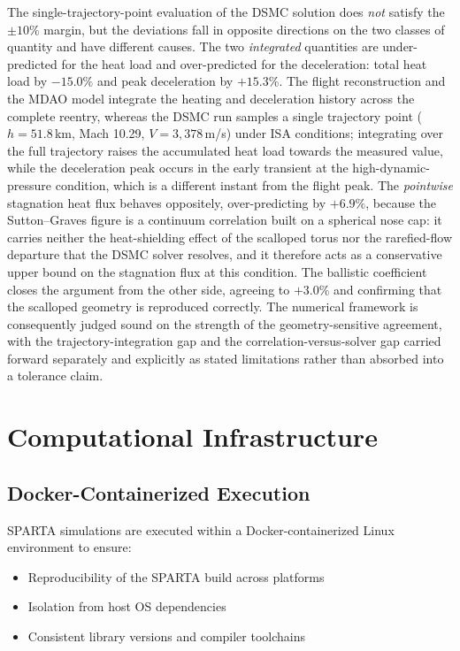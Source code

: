 The single-trajectory-point evaluation of the DSMC solution does \emph{not} satisfy the $\pm 10\%$ margin, but the deviations fall in opposite directions on the two classes of quantity and have different causes. The two \emph{integrated} quantities are under-predicted for the heat load and over-predicted for the deceleration: total heat load by $-15.0\%$ and peak deceleration by $+15.3\%$. The flight reconstruction and the MDAO model integrate the heating and deceleration history across the complete reentry, whereas the DSMC run samples a single trajectory point ($h = 51.8$\,km, Mach 10.29, $V = 3{,}378$\,m/s) under ISA conditions; integrating over the full trajectory raises the accumulated heat load towards the measured value, while the deceleration peak occurs in the early transient at the high-dynamic-pressure condition, which is a different instant from the flight peak. The \emph{pointwise} stagnation heat flux behaves oppositely, over-predicting by $+6.9\%$, because the Sutton--Graves figure is a continuum correlation built on a spherical nose cap: it carries neither the heat-shielding effect of the scalloped torus nor the rarefied-flow departure that the DSMC solver resolves, and it therefore acts as a conservative upper bound on the stagnation flux at this condition. The ballistic coefficient closes the argument from the other side, agreeing to $+3.0\%$ and confirming that the scalloped geometry is reproduced correctly. The numerical framework is consequently judged sound on the strength of the geometry-sensitive agreement, with the trajectory-integration gap and the correlation-versus-solver gap carried forward separately and explicitly as stated limitations rather than absorbed into a tolerance claim.

\section{Computational Infrastructure}

\subsection{Docker-Containerized Execution}
SPARTA simulations are executed within a Docker-containerized Linux environment to ensure:
\begin{itemize}
    \item Reproducibility of the SPARTA build across platforms
    \item Isolation from host OS dependencies
    \item Consistent library versions and compiler toolchains
\end{itemize}

